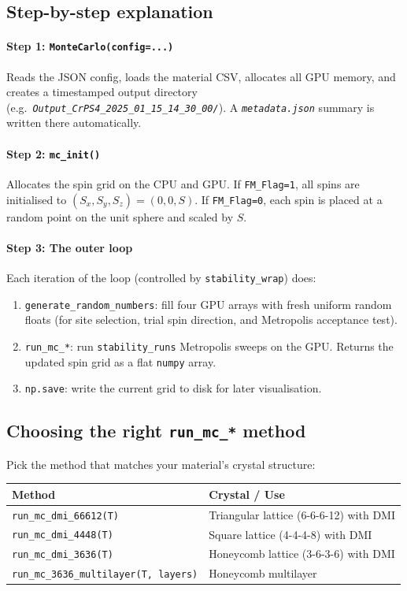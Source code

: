 \documentclass[12pt,a4paper]{article}
\newcommand{\code}[1]{\texttt{#1}}
\newcommand{\file}[1]{\texttt{\textit{#1}}}
\newcommand{\param}[1]{\texttt{#1}}
\begin{document}
\subsection{Step-by-step explanation}

\paragraph{Step 1: \code{MonteCarlo(config=...)}}
Reads the JSON config, loads the material CSV, allocates all GPU memory, and
creates a timestamped output directory (e.g.\ \file{Output\_CrPS4\_2025\_01\_15\_14\_30\_00/}).
A \file{metadata.json} summary is written there automatically.

\paragraph{Step 2: \code{mc\_init()}}
Allocates the spin grid on the CPU and GPU. If \param{FM\_Flag=1}, all spins
are initialised to $(S_x, S_y, S_z) = (0, 0, S)$. If \param{FM\_Flag=0}, each
spin is placed at a random point on the unit sphere and scaled by $S$.

\paragraph{Step 3: The outer loop}
Each iteration of the loop (controlled by \param{stability\_wrap}) does:
\begin{enumerate}
  \item \code{generate\_random\_numbers}: fill four GPU arrays with fresh uniform
        random floats (for site selection, trial spin direction, and
        Metropolis acceptance test).
  \item \code{run\_mc\_*}: run \param{stability\_runs} Metropolis sweeps on the
        GPU. Returns the updated spin grid as a flat \code{numpy} array.
  \item \code{np.save}: write the current grid to disk for later visualisation.
\end{enumerate}

\subsection{Choosing the right \code{run\_mc\_*} method}

Pick the method that matches your material's crystal structure:

\begin{center}
\begin{tabular}{ll}
\toprule
\textbf{Method} & \textbf{Crystal / Use} \\
\midrule
\code{run\_mc\_dmi\_66612(T)} & Triangular lattice (6-6-6-12) with DMI \\
\code{run\_mc\_dmi\_4448(T)}  & Square lattice (4-4-4-8) with DMI \\
\code{run\_mc\_dmi\_3636(T)}  & Honeycomb lattice (3-6-3-6) with DMI \\
\code{run\_mc\_3636\_multilayer(T, layers)} & Honeycomb multilayer \\
\bottomrule
\end{tabular}
\end{center}
\end{document}
